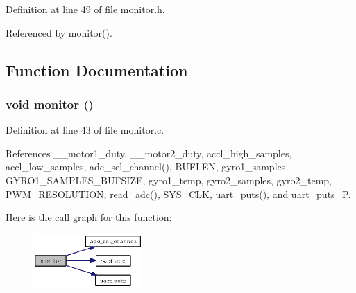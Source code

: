 Definition at line 49 of file monitor.h.

Referenced by monitor().

\subsection{Function Documentation}
\subsubsection{\setlength{\rightskip}{0pt plus 5cm}void monitor ()}\label{group__ro__monitor_g0e89037e727d646088e956504e02ef8b}




Definition at line 43 of file monitor.c.

References \_\-\_\-motor1\_\-duty, \_\-\_\-motor2\_\-duty, accl\_\-high\_\-samples, accl\_\-low\_\-samples, adc\_\-sel\_\-channel(), BUFLEN, gyro1\_\-samples, GYRO1\_\-SAMPLES\_\-BUFSIZE, gyro1\_\-temp, gyro2\_\-samples, gyro2\_\-temp, PWM\_\-RESOLUTION, read\_\-adc(), SYS\_\-CLK, uart\_\-puts(), and uart\_\-puts\_\-P.

Here is the call graph for this function:\begin{figure}[H]
\begin{center}
\leavevmode
\includegraphics[width=118pt]{group__ro__monitor_g0e89037e727d646088e956504e02ef8b_cgraph}
\end{center}
\end{figure}
